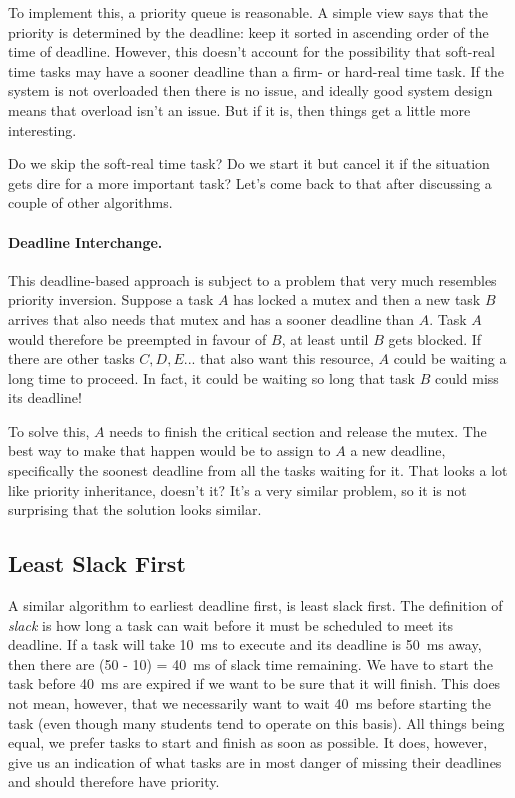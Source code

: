 To implement this, a priority queue is reasonable. A simple view says that the priority is determined by the deadline: keep it sorted in ascending order of the time of deadline. However, this doesn't account for the possibility that soft-real time tasks may have a sooner deadline than a firm- or hard-real time task. If the system is not overloaded then there is no issue, and ideally good system design means that overload isn't an issue. But if it is, then things get a little more interesting.

Do we skip the soft-real time task? Do we start it but cancel it if the situation gets dire for a more important task? Let's come back to that after discussing a couple of other algorithms.

\paragraph{Deadline Interchange.}
This deadline-based approach is subject to a problem that very much resembles priority inversion. Suppose a task $A$ has locked a mutex and then a new task $B$ arrives that also needs that mutex and has a sooner deadline than $A$. Task $A$ would therefore be preempted in favour of $B$, at least until $B$ gets blocked. If there are other tasks $C, D, E$... that also want this resource, $A$ could be waiting a long time to proceed. In fact, it could be waiting so long that task $B$ could miss its deadline!

To solve this, $A$ needs to finish the critical section and release the mutex. The best way to make that happen would be to assign to $A$ a new deadline, specifically the soonest deadline from all the tasks waiting for it. That looks a lot like priority inheritance, doesn't it? It's a very similar problem, so it is not surprising that the solution looks similar.

\subsection*{Least Slack First}
A similar algorithm to earliest deadline first, is least slack first. The definition of \textit{slack} is how long a task can wait before it must be scheduled to meet its deadline. If a task will take 10~ms to execute and its deadline is 50~ms away, then there are (50 - 10) = 40~ms of slack time remaining. We have to start the task before 40~ms are expired if we want to be sure that it will finish. This does not mean, however, that we necessarily want to wait 40~ms before starting the task (even though many students tend to operate on this basis). All things being equal, we prefer tasks to start and finish as soon as possible. It does, however, give us an indication of what tasks are in most danger of missing their deadlines and should therefore have priority.

